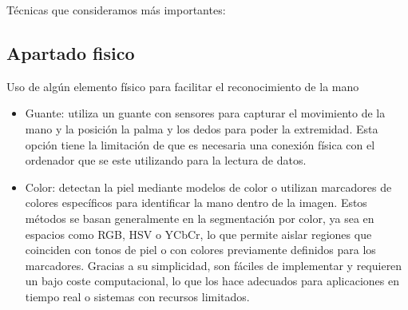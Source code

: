 \documentclass[10pt,a4paper,twocolumn,twoside]{article}
\begin{document}
Técnicas que consideramos más importantes: 

\subsection{Apartado fisico}

Uso de algún elemento físico para facilitar el reconocimiento de la mano
\begin{itemize}
\item	Guante: utiliza un guante con sensores para capturar el movimiento de la mano y la posición la palma y los dedos para poder la extremidad. Esta opción tiene la limitación de que es necesaria una conexión física con el ordenador que se este utilizando para la lectura de datos. 
\item	Color: detectan la piel mediante modelos de color o utilizan marcadores de colores específicos para identificar la mano dentro de la imagen. Estos métodos se basan generalmente en la segmentación por color, ya sea en espacios como RGB, HSV o YCbCr, lo que permite aislar regiones que coinciden con tonos de piel o con colores previamente definidos para los marcadores. Gracias a su simplicidad, son fáciles de implementar y requieren un bajo coste computacional, lo que los hace adecuados para aplicaciones en tiempo real o sistemas con recursos limitados. 
\end{itemize}
\end{document}
